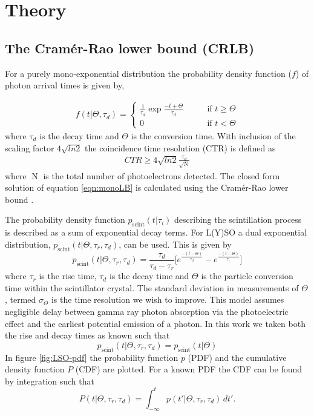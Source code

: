 \section{Theory}
\label{sec:theory}

\subsection{The Cram\'{e}r-Rao lower bound (CRLB)} 
For a purely mono-exponential distribution the probability density function ($f$) of photon arrival times is given by, 

\begin{eqnarray}
f(t|\Theta,\tau_d)=\begin{cases} \frac{1}{\tau_d}\exp{\frac{-t+\Theta}{\tau_d}}
&\qquad\mbox{if } t \geq\Theta \\
0 &\qquad \mbox{if } t < \Theta \end{cases}
\label{eqn:monoexp}
\end{eqnarray}
where $\tau_d$ is the decay time and $\Theta$ is the conversion time. With inclusion of the scaling factor $4\sqrt{ln2}$ the coincidence time resolution (CTR) is defined as
\begin{eqnarray}
CTR \geq 4\sqrt{ln2}\frac{\tau_d}{\sqrt{\operatorname{N}}}
\label{eqn:monoLB}
\end{eqnarray}
where $\operatorname{N}$ is the total number of photoelectrons detected. The closed form solution of equation \ref{eqn:monoLB} is calculated using the Cram\'{e}r-Rao lower bound \cite{degroot2011probability}. 

The probability density function $p_\text{scint}(t|\tau_i)$ describing the scintillation process is
described as a sum of exponential decay terms\cite{birks1964theory}. For L(Y)SO a dual exponential distribution, $p_\text{scint}(t|\Theta,\tau_r,\tau_d)$, can be used. This is given by
\begin{equation}
p_\text{scint}(t|\Theta,\tau_r,\tau_d) = \frac{\tau_d}{\tau_d-\tau_r}\Big[e^{\frac{-(t-\Theta)}{\tau_d}}-e^{\frac{-(t-\Theta)}{\tau_r}}\Big]
\label{eqn:dual}
\end{equation}
where $\tau_r$ is the rise time, $\tau_d$ is the decay time and $\Theta$ is the particle conversion time within the scintillator crystal. The standard deviation in measurements of $\Theta$, termed $\sigma_\Theta$ is the time resolution we wish to improve. This model assumes negligible delay between gamma ray photon absorption via the photoelectric effect and the earliest potential emission of a photon. In this work we taken both the rise and decay times as known such that
\begin{equation}
p_\text{scint}(t|\Theta,\tau_r,\tau_d) = p_\text{scint}(t|\Theta)
\end{equation}
In figure \ref{fig:LSO-pdf} the probability function $p$ (PDF) and the cumulative density function $P$ (CDF) are plotted. For a known PDF the CDF can be found by integration such that
\begin{equation}
P(t|\Theta,\tau_r,\tau_d) = \int_{-\infty}^t p(t'|\Theta,\tau_r,\tau_d)\,dt'.
\label{eqn:cdf}
\end{equation}


